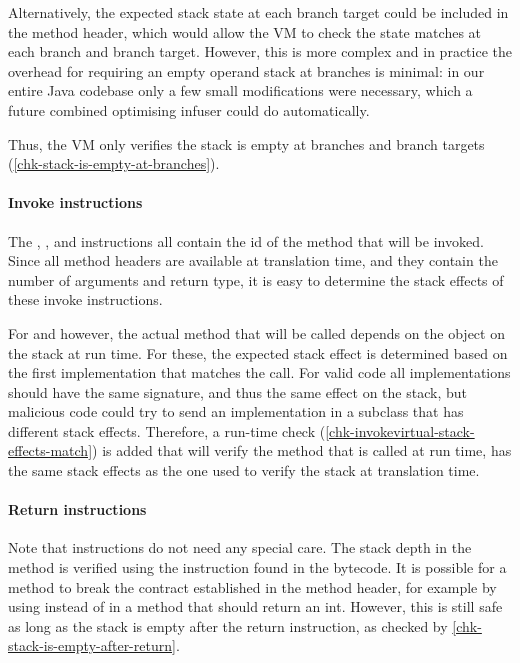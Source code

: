 Alternatively, the expected stack state at each branch target could be included in the method header, which would allow the VM to check the state matches at each branch and branch target. However, this is more complex and in practice the overhead for requiring an empty operand stack at branches is minimal: in our entire Java codebase only a few small modifications were necessary, which a future combined optimising infuser could do automatically.

Thus, the VM only verifies the stack is empty at branches and branch targets (\ref{chk-stack-is-empty-at-branches}).

\paragraph{Invoke instructions}
The , , and  instructions all contain the id of the method that will be invoked. Since all method headers are available at translation time, and they contain the number of arguments and return type, it is easy to determine the stack effects of these invoke instructions.
 
For  and  however, the actual method that will be called depends on the object on the stack at run time. For these, the expected stack effect is determined based on the first implementation that matches the call. For valid code all implementations should have the same signature, and thus the same effect on the stack, but malicious code could try to send an implementation in a subclass that has different stack effects. Therefore, a run-time check (\ref{chk-invokevirtual-stack-effects-match}) is added that will verify the method that is called at run time, has the same stack effects as the one used to verify the stack at translation time.

\paragraph{Return instructions}
Note that  instructions do not need any special care. The stack depth in the method is verified using the instruction found in the bytecode. It is possible for a method to break the contract established in the method header, for example by using  instead of  in a method that should return an int. However, this is still safe as long as the stack is empty after the return instruction, as checked by \ref{chk-stack-is-empty-after-return}.

